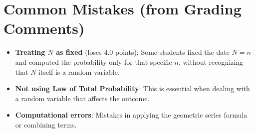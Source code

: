 \documentclass[11pt]{article}
\begin{document}
\section{Common Mistakes (from Grading Comments)}

\begin{itemize}
    \item \textbf{Treating $N$ as fixed} (loses 4.0 points): Some students fixed the date $N = n$ and computed the probability only for that specific $n$, without recognizing that $N$ itself is a random variable.

    \item \textbf{Not using Law of Total Probability}: This is essential when dealing with a random variable that affects the outcome.

    \item \textbf{Computational errors}: Mistakes in applying the geometric series formula or combining terms.
\end{itemize}
\end{document}
